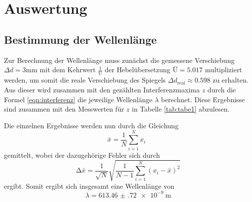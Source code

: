 \section{Auswertung}
\label{sec:Auswertung}
\subsection{Bestimmung der Wellenlänge}
Zur Berechnung der Wellenlänge muss zunächst die gemessene Verschiebung
$\Delta d = 3 \si{\milli\meter}$
mit dem Kehrwert $\frac{1}{\text{Ü}}$ der Hebelübersetzung $\text{Ü}=5.017$ multipliziert werden,
um somit die reale Verschiebung des Spiegels $\Delta d_{\text{real}} \approx 0.598$ zu erhalten.
Aus dieser wird zusammen mit den gezählten Interferenzmaxima $z$ durch die Formel
\ref{eqn:interferenz} die jeweilige Wellenlänge $\lambda$ berechnet. Diese Ergebnisse sind
zusammen mit den Messwerten für $z$ in Tabelle \ref{tab:tabe1} abzulesen.

Die einzelnen Ergebnisse werden nun durch die Gleichung
\begin{equation}
  \bar{x} = \frac{1}{N} \sum_{i=1}^{N} x_i \: \:
  \label{eqn:mit}
\end{equation}
\noindent gemittelt, wobei der dazugehörige Fehler sich durch
\begin{equation}
  \increment \bar{x} = \frac{1}{\sqrt{N}} \sqrt{ \frac{1}{N-1} \sum_{i=1}^N
  (x_i - \bar{x})^2}
  \label{eqn:mitf}
\end{equation}
ergibt.
Somit ergibt sich insgesamt eine Wellenlänge von
\begin{equation*}
  \lambda= \SI{613.46(72)e-9}{\meter}
\end{equation*}
